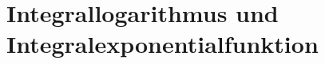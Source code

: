 %
%
%
\section{Integrallogarithmus und Integralexponentialfunktion
\label{buch:exponential:section:eili}}
